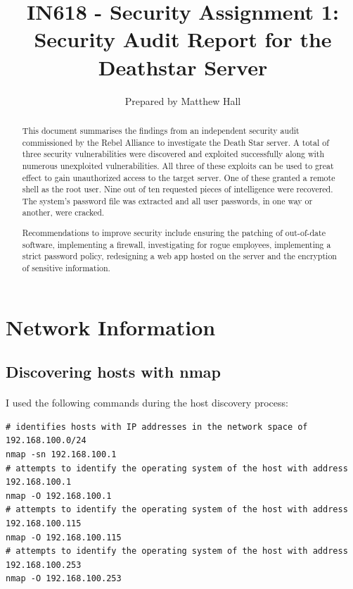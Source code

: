 \documentclass{article}
\title{IN618 - Security Assignment 1: Security Audit Report for the Deathstar Server}
\author{Prepared by Matthew Hall}
\date{}
\begin{document}
\maketitle
\renewcommand{\abstractname}{Executive Summary}
\begin{abstract}	
This document summarises the findings from an independent security audit commissioned by the Rebel Alliance to investigate the Death Star server.
A total of three security vulnerabilities were discovered and exploited successfully along with numerous unexploited vulnerabilities.
All three of these exploits can be used to great effect to gain unauthorized access to the target server.
One of these granted a remote shell as the root user.
Nine out of ten requested pieces of intelligence were recovered.
The system's password file was extracted and all user passwords, in one way or another, were cracked.

Recommendations to improve security include ensuring the patching of out-of-date software, implementing a firewall, investigating for rogue employees, implementing a strict password policy, redesigning a web app hosted on the server and the encryption of sensitive information.
\end{abstract}
\newpage
{}

\tableofcontents
\newpage

\section{Network Information}
\label{sec:network_information}

\subsection{Discovering hosts with nmap}
\label{subsec:discovering_hosts}
\paragraph{}
I used the following commands during the host discovery process:
\begin{adjustwidth}{-1cm}{}
\begin{verbatim}
# identifies hosts with IP addresses in the network space of 192.168.100.0/24
nmap -sn 192.168.100.1
# attempts to identify the operating system of the host with address 192.168.100.1
nmap -O 192.168.100.1
# attempts to identify the operating system of the host with address 192.168.100.115
nmap -O 192.168.100.115
# attempts to identify the operating system of the host with address 192.168.100.253
nmap -O 192.168.100.253
\end{verbatim}
\end{adjustwidth}
\end{document}
